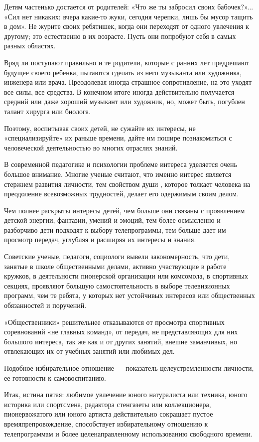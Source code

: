 \documentclass[12pt, a4paper, openany]{book}
\begin{document}
Детям частенько достается от родителей: «Что же ты забросил своих бабочек?»... «Сил нет никаких: вчера какие-то жуки, сегодня черепки, лишь бы мусор тащить в дом». Не журите своих ребятишек, когда они переходят от одного увлечения к другому; это естественно в их возрасте. Пусть они попробуют себя в самых разных областях. 

Вряд ли поступают правильно и те родители, которые с ранних лет предрешают будущее своего ребенка, пытаются сделать из него музыканта или художника, инженера или врача. Преодолевая иногда страшное сопротивление, на это уходят все силы, все средства. В конечном итоге иногда действительно получается средний или даже хороший музыкант или художник, но, может быть, погублен талант хирурга или биолога.

Поэтому, воспитывая своих детей, не сужайте их интересы, не «специализируйте» их раньше времени, дайте им пошире познакомиться с человеческой деятельностью во многих отраслях знаний. 

В современной педагогике и психологии проблеме интереса уделяется очень большое внимание. Многие ученые считают, что именно интерес является стержнем развития личности, тем свойством души , которое толкает человека на преодоление всевозможных трудностей, делает его одержимым своим делом. 

Чем полнее раскрыты интересы детей, чем больше они связаны с проявлением детской энергии, фантазии, умений и эмоций, тем более осмысленно и разборчиво дети подходят к выбору телепрограммы, тем больше дает им просмотр передач, углубляя и расширяя их интересы и знания. 

Советские ученые, педагоги, социологи вывели закономерность, что дети, занятые в школе общественными делами, активно участвующие в работе кружков, в деятельности пионерской организации или комсомола, в спортивных секциях, проявляют большую самостоятельность в выборе телевизионных программ, чем те ребята, у которых нет устойчивых интересов или общественных обязанностей и поручений. 

«Общественники» решительнее отказываются от просмотра спортивных соревнований «не главных команд», от передач, не представляющих для них большого интереса, так же как и от других занятий, внешне заманчивых, но отвлекающих их от учебных занятий или любимых дел. 

Подобное избирательное отношение — показатель целеустремленности личности, ее готовности к самовоспитанию. 

Итак, истина пятая: любимое увлечение юного натуралиста или техника, юного историка или спортсмена, редактора стенгазеты или коллекционера, пионервожатого или юного артиста действительно сокращает пустое времяпрепровождение, способствует избирательному отношению к телепрограммам и более целенаправленному использованию свободного времени. 
\end{document}

